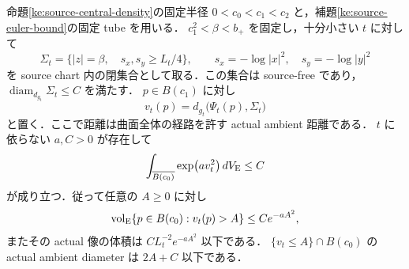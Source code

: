 \begin{proposition}
\label{ke:source-shell-gaussian-tail}
命題\ref{ke:source-central-density}の固定半径
$0<c_0<c_1<c_2$ と，補題\ref{ke:source-euler-bound}の固定 tube を用いる．
$c_1^2<\beta<b_+$ を固定し，十分小さい $t$ に対して
\[
 \Sigma_t=\{|z|=\beta,\quad s_x,s_y\ge L_t/4\},
 \qquad s_x=-\log|x|^2,\quad s_y=-\log|y|^2
\]
を source chart 内の閉集合として取る．この集合は source-free であり，
$\operatorname{diam}_{d_{g_t}}\Sigma_t\le C$ を満たす．
$p\in B(c_1)$ に対し
\[
 v_t(p)=d_{g_t}\bigl(\Psi_t(p),\Sigma_t\bigr)
\]
と置く．ここで距離は曲面全体の経路を許す actual ambient 距離である．
$t$ に依らない $a,C>0$ が存在して
\begin{equation}\label{ke:eq:source-shell-gaussian-tail}
 \int_{\overline{B(c_0)}}\exp\bigl(a v_t^2\bigr)\,dV_{\rm E}\le C
\end{equation}
が成り立つ．従って任意の $A\ge0$ に対し
\[
 \operatorname{vol}_{\rm E}\{p\in B(c_0):v_t(p)>A\}
 \le C e^{-aA^2},
\]
またその actual 像の体積は $CL_t^{-2}e^{-aA^2}$ 以下である．
$\{v_t\le A\}\cap B(c_0)$ の actual ambient diameter は $2A+C$ 以下である．
\end{proposition}

